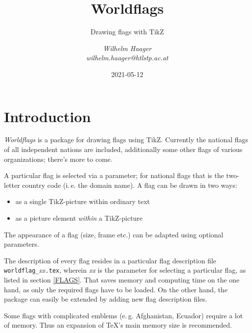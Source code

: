 \documentclass[11pt,a4paper,headsepline,fleqn]{scrreprt}
\begin{document}
\title{Worldflags}
\subtitle{Drawing flags with TikZ}
\author{\slshape Wilhelm Haager\\\slshape wilhelm.haager@htlstp.ac.at}
\vfill
\vfill
\date{2021-05-12}
\vfill
\maketitle

 \tableofcontents

\chapter{Introduction}

\emph{Worldflags} is a package for drawing flags using TikZ.
Currently the national flags of all independent nations are included,
additionally some other flags of various organizations;
there's more to come.

A particular flag is selected via a parameter; for national flags that is the
two-letter country code (i.\,e. the domain name).
A flag can be drawn in two ways:
\begin{itemize}
\item as a single TikZ-picture within ordinary text
\item as a picture element \emph{within} a TikZ-picture
\end{itemize}

The appearance of a flag (size, frame etc.) can be adapted using
optional parameters.

The description of every flag resides in a particular flag description file
{\color{emphcolor}\texttt{worldflag\_}\textit{xx}\texttt{.tex}},
wherein \textit{xx} is the parameter for selecting a particular flag,
as listed in section \ref{FLAGS}.
That saves memory and computing time on the one hand,
as only the required flags have to be loaded.
On the other hand, the package can easily be extended by adding new
flag description files.

Some flags with complicated emblems (e.\,g. Afghanistan, Ecuador)
require a lot of memory. Thus an expansion of \TeX's main memory size
is recommended.
\end{document}
